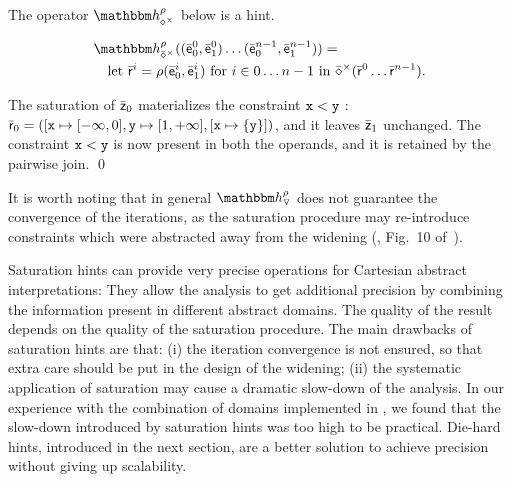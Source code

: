 \documentclass[sttt]{svjour}
\begin{document}
\begin{lemma}
The operator $\hint{\op^\times}^{\rho}$ below is a hint.
\begin{small}
  \[
  \begin{split}
    &\hint{\ael{\op}^\times}^{\rho}((\ael{e}^0_0, \ael{e}^0_1) \dots
    (\ael{e}^{n-1}_0, \ael{e}^{n-1}_1)) = \\   
& \quad \mathrm{let}\ \ael{r}^i
    = \rho(\ael{e}_0^i, \ael{e}_1^i)\ \mathrm{for}\ i \in 0 \dots n-1\ 
 \mathrm{in}\ \ael{\op}^\times(\ael{r}^0 \dots \ael{r}^{n-1}).
  \end{split}
 \]
\end{small}
\end{lemma}


\begin{example}
The saturation of $\bar{\mathsf{\mathsf{z}}}_0$ materializes the constraint $\mathtt{x} < \mathtt{y}$ : $\bar{\mathsf{\mathsf{r}}}_0 = ([\mathtt{x} \mapsto [-\infty, 0], \mathtt{y} \mapsto [1, +\infty],  [\mathtt{x} \mapsto \{ \mathtt{y}\}] )$, and it leaves $\bar{\mathsf{\mathsf{z}}}_1$ unchanged.
The constraint $\mathtt{x} < \mathtt{y}$ is now  present in both the operands, and it is retained by the pairwise join. \qed
\end{example}

It is worth noting that in general $\hint{\widening}^{\rho}$ does not
guarantee the convergence of the iterations, as the saturation
procedure may re-introduce constraints which were abstracted away from
the widening (\eg, Fig.~10 of~\cite{Mine01-2}).

Saturation hints can provide very precise operations for Cartesian abstract interpretations:
They allow the analysis to get additional precision by combining the information present in different abstract domains.
The quality of the result depends on the quality of the saturation procedure.
The main drawbacks of saturation hints are that: (i) the iteration convergence is not ensured, so that extra care should be put in the design of the widening; (ii) the systematic application of saturation may cause a dramatic slow-down of the  analysis.
In our experience with the combination of domains implemented in \Clousot, we found that the slow-down introduced by saturation hints was too high to be practical.
Die-hard hints, introduced in the next section, are a better solution to achieve precision without giving up scalability.
\end{document}
